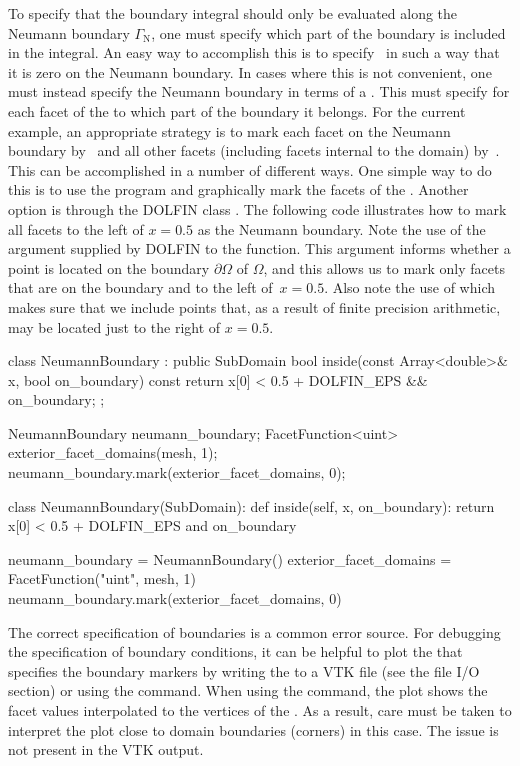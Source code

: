 To specify that the boundary integral  should only
be evaluated along the Neumann boundary $\Gamma_{\mathrm{N}}$, one
must specify which part of the boundary is included in the 
integral. An easy way to accomplish this is to specify~ in such
a way that it is zero on the Neumann boundary. In cases where this is
not convenient, one must instead specify the Neumann boundary in terms
of a . This  must specify for
each facet of the  to which part of the boundary it
belongs. For the current example, an appropriate strategy is to mark
each facet on the Neumann boundary by~ and all other facets
(including facets internal to the domain) by~. This can be
accomplished in a number of different ways. One simple way to do this
is to use the program \citet{www:meshbuilder} and graphically mark the
facets of the . Another option is through the DOLFIN class
. The following code illustrates how to mark all facets
to the left of $x = 0.5$ as the Neumann boundary. Note the use of the
 argument supplied by DOLFIN to the 
function. This argument informs whether a point is located on the
boundary $\partial\Omega$ of $\Omega$, and this allows us to mark only
facets that are on the boundary and to the left of~$x = 0.5$. Also
note the use of  which makes sure that we include
points that, as a result of finite precision arithmetic, may be located
just to the right of $x = 0.5$.
\begin{c++}
class NeumannBoundary : public SubDomain
{
  bool inside(const Array<double>& x, bool on_boundary) const
  {
    return x[0] < 0.5 + DOLFIN_EPS && on_boundary;
  }
};

NeumannBoundary neumann_boundary;
FacetFunction<uint> exterior_facet_domains(mesh, 1);
neumann_boundary.mark(exterior_facet_domains, 0);
\end{c++}
\begin{python}
class NeumannBoundary(SubDomain):
    def inside(self, x, on_boundary):
        return x[0] < 0.5 + DOLFIN_EPS and on_boundary

neumann_boundary = NeumannBoundary()
exterior_facet_domains = FacetFunction("uint", mesh, 1)
neumann_boundary.mark(exterior_facet_domains, 0)
\end{python}
The correct specification of boundaries is a common error source. For
debugging the specification of boundary conditions, it can be helpful
to plot the  that specifies the boundary markers by
writing the  to a VTK file (see the file I/O section)
or using the  command. When using the  command,
the plot shows the facet values interpolated to the vertices of the
. As a result, care must be taken to interpret the plot close
to domain boundaries (corners) in this case. The issue is not present
in the VTK output.

